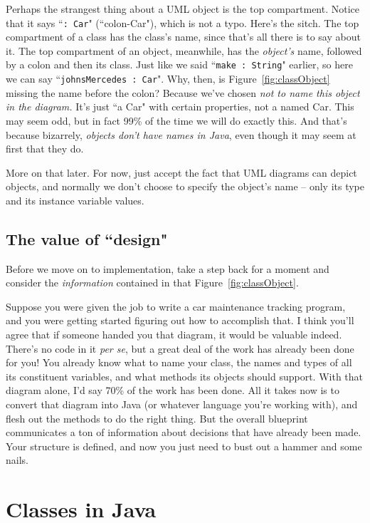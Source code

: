 Perhaps the strangest thing about a UML object is the top compartment. Notice
that it says ``\texttt{: Car}" (``colon-Car"), which is not a typo. Here's the
sitch. The top compartment of a class has the class's name, since that's all
there is to say about it. The top compartment of an object, meanwhile, has the
\textit{object's} name, followed by a colon and then its class. Just like we
said ``\texttt{make : String}" earlier, so here we can say
``\texttt{johnsMercedes : Car}". Why, then, is Figure~\ref{fig:classObject}
missing the name before the colon? Because we've chosen \textit{not to name
this object in the diagram.} It's just ``a Car" with certain properties, not a
named Car. This may seem odd, but in fact 99\% of the time we will do exactly
this. And that's because bizarrely, \textit{objects don't have names in Java},
even though it may seem at first that they do.

More on that later. For now, just accept the fact that UML diagrams can depict
objects, and normally we don't choose to specify the object's name -- only its
type and its instance variable values.


\subsection{The value of ``design"}

Before we move on to implementation, take a step back for a moment and
consider the \textit{information} contained in that
Figure~\ref{fig:classObject}.

Suppose you were given the job to write a car maintenance tracking program,
and you were getting started figuring out how to accomplish that. I think
you'll agree that if someone handed you that diagram, it would be valuable
indeed. There's no code in it \textit{per se}, but a great deal of the work
has already been done for you! You already know what to name your class, the
names and types of all its constituent variables, and what methods its objects
should support. With that diagram alone, I'd say 70\% of the work has been
done. All it takes now is to convert that diagram into Java (or whatever
language you're working with), and flesh out the methods to do the right
thing. But the overall blueprint communicates a ton of information about
decisions that have already been made. Your structure is defined, and now you
just need to bust out a hammer and some nails.


\section{Classes in Java}

